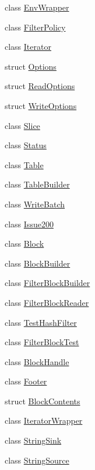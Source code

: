 \begin{DoxyCompactItemize}
\item 
class \hyperlink{classleveldb_1_1_env_wrapper}{Env\-Wrapper}
\item 
class \hyperlink{classleveldb_1_1_filter_policy}{Filter\-Policy}
\item 
class \hyperlink{classleveldb_1_1_iterator}{Iterator}
\item 
struct \hyperlink{structleveldb_1_1_options}{Options}
\item 
struct \hyperlink{structleveldb_1_1_read_options}{Read\-Options}
\item 
struct \hyperlink{structleveldb_1_1_write_options}{Write\-Options}
\item 
class \hyperlink{classleveldb_1_1_slice}{Slice}
\item 
class \hyperlink{classleveldb_1_1_status}{Status}
\item 
class \hyperlink{classleveldb_1_1_table}{Table}
\item 
class \hyperlink{classleveldb_1_1_table_builder}{Table\-Builder}
\item 
class \hyperlink{classleveldb_1_1_write_batch}{Write\-Batch}
\item 
class \hyperlink{classleveldb_1_1_issue200}{Issue200}
\item 
class \hyperlink{classleveldb_1_1_block}{Block}
\item 
class \hyperlink{classleveldb_1_1_block_builder}{Block\-Builder}
\item 
class \hyperlink{classleveldb_1_1_filter_block_builder}{Filter\-Block\-Builder}
\item 
class \hyperlink{classleveldb_1_1_filter_block_reader}{Filter\-Block\-Reader}
\item 
class \hyperlink{classleveldb_1_1_test_hash_filter}{Test\-Hash\-Filter}
\item 
class \hyperlink{classleveldb_1_1_filter_block_test}{Filter\-Block\-Test}
\item 
class \hyperlink{classleveldb_1_1_block_handle}{Block\-Handle}
\item 
class \hyperlink{classleveldb_1_1_footer}{Footer}
\item 
struct \hyperlink{structleveldb_1_1_block_contents}{Block\-Contents}
\item 
class \hyperlink{classleveldb_1_1_iterator_wrapper}{Iterator\-Wrapper}
\item 
class \hyperlink{classleveldb_1_1_string_sink}{String\-Sink}
\item 
class \hyperlink{classleveldb_1_1_string_source}{String\-Source}

\end{DoxyCompactItemize}
